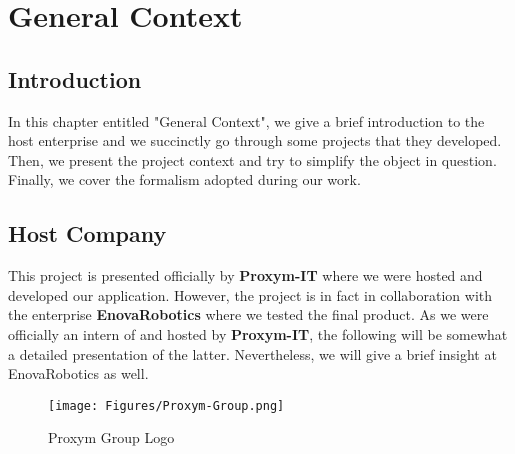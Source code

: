 
\chapter{General Context} %

\label{Chapter1} %


\newcommand{\keyword}[1]{\textbf{#1}}
\newcommand{\tabhead}[1]{\textbf{#1}}
\newcommand{\code}[1]{\texttt{#1}}
\newcommand{\file}[1]{\texttt{\bfseries#1}}
\newcommand{\option}[1]{\texttt{\itshape#1}}


\section{Introduction}
In this chapter entitled "General Context", we give a brief introduction to the host enterprise and we succinctly go through some projects that they developed. Then, we present the project context and try to simplify the object in question. Finally, we cover the formalism adopted during our work.   


\section{Host Company}
This project is presented officially by \textbf{Proxym-IT} where we were hosted and developed our application. However, the project is in fact in collaboration with the enterprise \textbf{EnovaRobotics} where we tested the final product. As we were officially an intern of and hosted by \textbf{Proxym-IT}, the following will be somewhat a detailed presentation of the latter. Nevertheless, we will give a brief insight at EnovaRobotics as well. 
\begin{figure}[th]
\centering
\texttt{[image: Figures/Proxym-Group.png]}
\caption{Proxym Group Logo}
\label{fig:Proxym Group Logo}
\end{figure}

